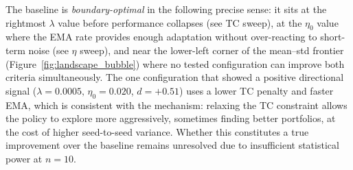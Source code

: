 \documentclass[conference]{IEEEtran}
\begin{document}
\begin{table}[t]
\centering
\caption{Consolidated hyperparameter landscape: all configurations
vs.\ baseline ($\lambda=0.001$, $\eta_0=0.010$). $d$: Cohen's~$d$
(positive = better than baseline). $^{**}$: $p<0.001$;
$^{*}$: $p<0.05$; n.s.: not significant.}
\label{tab:landscape_all}
\end{table}

The baseline is \emph{boundary-optimal} in the following
precise sense: it sits at the rightmost $\lambda$ value
before performance collapses (see TC sweep), at the
$\eta_0$ value where the EMA rate provides enough adaptation
without over-reacting to short-term noise (see $\eta$ sweep),
and near the lower-left corner of the mean--std frontier
(Figure~\ref{fig:landscape_bubble}) where no tested configuration
can improve both criteria simultaneously. The one configuration
that showed a positive directional signal
($\lambda=0.0005,\,\eta_0=0.020$, $d=+0.51$) uses a
lower TC penalty and faster EMA, which is consistent with
the mechanism: relaxing the TC constraint allows the policy
to explore more aggressively, sometimes finding better
portfolios, at the cost of higher seed-to-seed variance.
Whether this constitutes a true improvement over the baseline
remains unresolved due to insufficient statistical power
at $n=10$.
\end{document}
